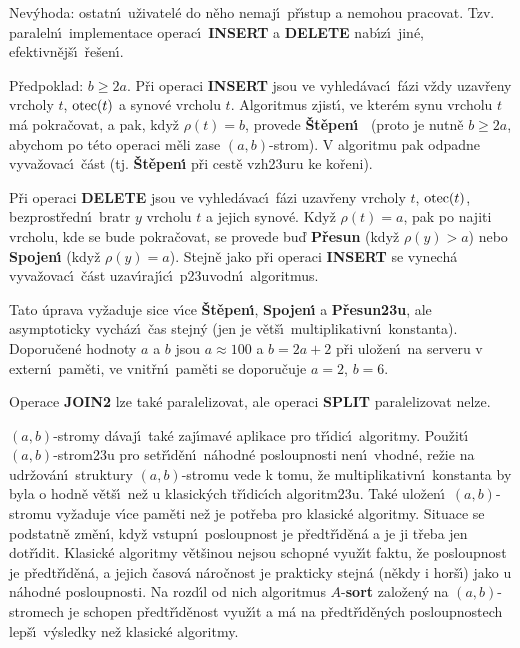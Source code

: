 \flushpar Nev\'yhoda: ostatn\'\i\ u\v zivatel\'e  
do n\v eho nemaj\'\i\ p\v r\'\i stup a nemohou pracovat. Tzv. paraleln\'\i\ 
implementace operac\'\i\ {\bf INSERT} a {\bf DELETE} nab\'\i z\'\i\ jin\'e, 
efektivn\v ej\v s\'\i\ \v re\v sen\'\i .
\medskip

\flushpar P\v redpoklad: $b\ge 2a$. \newline 
P\v ri operaci {\bf INSERT} jsou ve vyhled\'avac\'\i\ f\'azi v\v zdy 
uzav\v reny vrcholy $t$, $\operatorname{otec}(t)$ a synov\'e vrcholu $t$. 
Algoritmus zjist\'\i , ve kter\'em synu vrcholu $t$ m\'a 
pokra\v covat, a pak, kdy\v z $\rho (t)=b$, provede {\bf \v St\v epen\'\i\ }
(proto je nutn\v e $b\ge 2a$, abychom po t\'eto ope\-raci m\v eli 
zase $(a,b)$-strom). V algoritmu pak odpadne vyva\-\v zo\-vac\'\i\ 
\v c\'ast (tj. {\bf \v St\v epen\'\i} p\v ri cest\v e vzh\accent23uru ke 
ko\v reni).
\medskip

\flushpar P\v ri operaci {\bf DELETE} jsou ve vyhled\'avac\'\i\ f\'azi uzav\v reny 
vrcholy $t$, $\operatorname{otec}(t)$, bezprost\v redn\'\i\ bratr $y$ vrcholu $
t$ a 
jejich synov\'e. 
Kdy\v z $\rho (t)=a$, pak po najiti vrcholu, kde se bude 
pokra\v covat, se provede bu\v d {\bf P\v resun} (kdy\v z $\rho (
y)>a$) nebo 
{\bf Spojen\'\i} (kdy\v z $\rho (y)=a$). Stejn\v e jako p\v ri operaci 
{\bf INSERT} se vynech\'a vyva\-\v zo\-vac\'\i\ \v c\'ast 
uzav\'\i raj\'\i c\'\i\ p\accent23uvodn\'\i\ algoritmus.
\medskip

\flushpar Tato \'uprava vy\v zaduje sice v\'\i ce {\bf \v St\v epen\'\i }, {\bf Spojen\'\i} a
{\bf P\v resun\accent23u}, ale asymptoticky vych\'az\'\i\ \v cas stejn\'y 
(jen je v\v et\v s\'\i\ multiplikativn\'\i\ konstanta). Doporu\v cen\'e 
hodnoty $a$ a $b$ jsou $a\approx 100$ a $b=2a+2$ p\v ri ulo\v zen\'\i\ na serveru 
v extern\'\i\ pam\v eti, ve vnit\v rn\'\i\ pam\v eti 
se doporu\v cuje $a=2$, $b=6$.
\medskip

\flushpar Operace {\bf JOIN2} lze tak\'e paralelizovat, ale operaci {\bf SPLIT  }
paralelizovat nelze.
\medskip

\flushpar$(a,b)$-stromy d\'avaj\'\i\ tak\'e zaj\'\i mav\'e aplikace pro 
t\v r\'\i dic\'\i\ 
algoritmy. Pou\v zit\'\i\ $(a,b)$-strom\accent23u pro set\v r\'\i d\v en\'\i\ 
n\'ahodn\'e posloupnosti nen\'\i\ vhodn\'e, re\v zie na udr\v zov\'an\'\i\ 
struktury $(a,b)$-stromu vede k tomu, \v ze multiplikativn\'\i\ 
konstanta by byla o hodn\v e v\v et\v s\'\i\ ne\v z u klasick\'ych 
t\v r\'\i dic\'\i ch algoritm\accent23u. Tak\'e ulo\v zen\'\i\ $(
a,b)$-stromu 
vy\v zaduje v\'\i ce pam\v eti ne\v z je pot\v reba pro klasick\'e 
algoritmy. Situace se podstatn\v e zm\v en\'\i , kdy\v z vstupn\'\i\ 
posloupnost je p\v red\-t\v r\'\i\-d\v en\'a a je ji t\v reba jen dot\v r\'\i dit. 
Klasick\'e algoritmy v\v et\v sinou nejsou schopn\'e vyu\v z\'\i t faktu, \v ze 
posloupnost je p\v redt\v r\'\i d\v en\'a, a jejich \v casov\'a n\'aro\v cnost je 
prakticky stejn\'a (n\v ekdy i hor\v s\'\i ) jako u n\'ahodn\'e 
posloupnosti. Na rozd\'\i l od nich algoritmus $A$-{\bf sort }
zalo\v zen\'y na $(a,b)$-stromech je schopen p\v redt\v r\'\i d\v enost 
vyu\v z\'\i t a m\'a na p\v redt\v r\'\i d\v en\'ych posloupnostech lep\v s\'\i\ 
v\'ysledky ne\v z klasick\'e algoritmy.
\medskip

